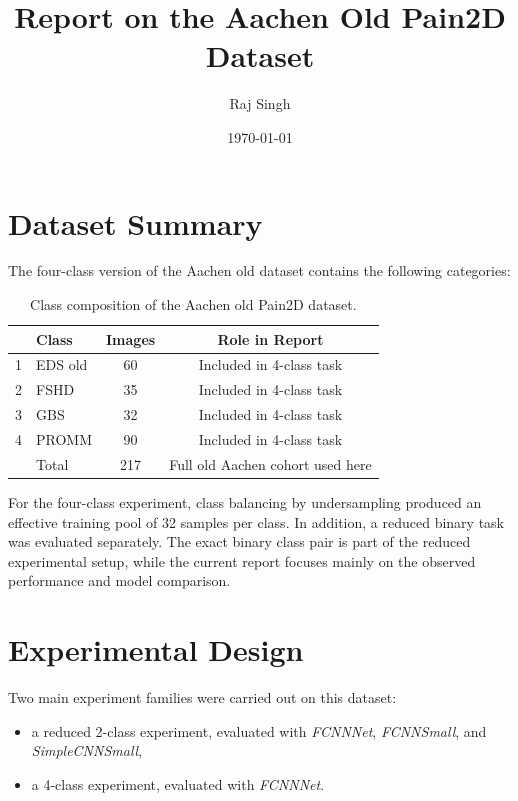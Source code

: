 \documentclass[11pt,a4paper]{article}
\title{Report on the Aachen Old Pain2D Dataset}
\author{Raj Singh}
\date{\today}
\begin{document}
\maketitle

\section{Dataset Summary}

The four-class version of the Aachen old dataset contains the following categories:

\begin{table}[H]
    \centering
    \begin{tabular}{|c|l|c|c|}
        \toprule
        & \textbf{Class} & \textbf{Images} & \textbf{Role in Report} \\
        \midrule
        1 & EDS old & 60 & Included in 4-class task \\
        2 & FSHD & 35 & Included in 4-class task \\
        3 & GBS & 32 & Included in 4-class task \\
        4 & PROMM & 90 & Included in 4-class task \\
        \midrule
        & Total & 217 & Full old Aachen cohort used here \\
        \bottomrule
    \end{tabular}
    \caption{Class composition of the Aachen old Pain2D dataset.}
\end{table}

For the four-class experiment, class balancing by undersampling produced an effective training pool of 32 samples per class. In addition, a reduced binary task was evaluated separately. The exact binary class pair is part of the reduced experimental setup, while the current report focuses mainly on the observed performance and model comparison.

\section{Experimental Design}

Two main experiment families were carried out on this dataset:

\begin{itemize}
    \item a reduced 2-class experiment, evaluated with \textit{FCNNNet}, \textit{FCNNSmall}, and \textit{SimpleCNNSmall},
    \item a 4-class experiment, evaluated with \textit{FCNNNet}.
\end{itemize}
\end{document}

